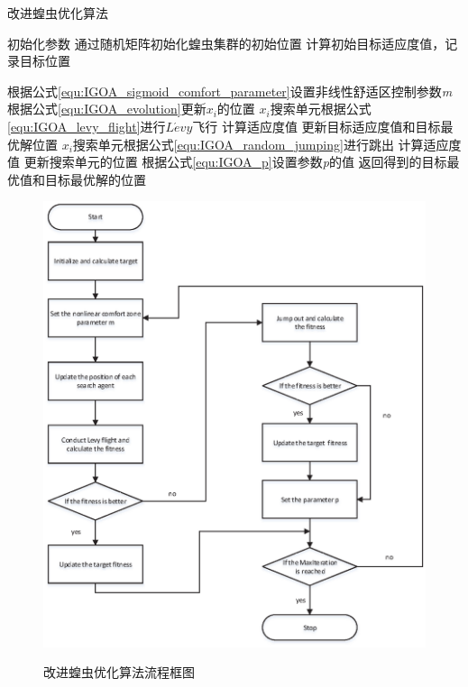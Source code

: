 \begin{algorithm}
    \caption{改进蝗虫优化算法}
    \label{alg:IGOA}
    
    \begin{algorithmic}[1]
    
    \State 初始化参数
    \State 通过随机矩阵初始化蝗虫集群的初始位置
    \State 计算初始目标适应度值，记录目标位置
    
    \State 根据公式\ref{equ:IGOA_sigmoid_comfort_parameter}设置非线性舒适区控制参数\emph{m}
    \State 根据公式\ref{equ:IGOA_evolution}更新$x_i$的位置
    \State $x_i$搜索单元根据公式\ref{equ:IGOA_levy_flight}进行$L\acute{e}vy$飞行
    \State 计算适应度值 
        \State 更新目标适应度值和目标最优解位置
    \Else
        \State $x_i$搜索单元根据公式\ref{equ:IGOA_random_jumping}进行跳出
        \State 计算适应度值
            \State 更新搜索单元的位置
        \EndIf
        \State 根据公式\ref{equ:IGOA_p}设置参数\emph{p}的值
    \EndIf
    \EndWhile
    \State 返回得到的目标最优值和目标最优解的位置
    \end{algorithmic}
\end{algorithm}

\graphicspath{{Img/}}
\begin{figure}[!htbp]
    \centering
    \includegraphics[width=1\linewidth]{procedure_of_IGOA.eps}\hfill\\[0.5cm]
  \caption{改进蝗虫优化算法流程框图}
  \label{fig:procedure_IGOA}
\end{figure}
